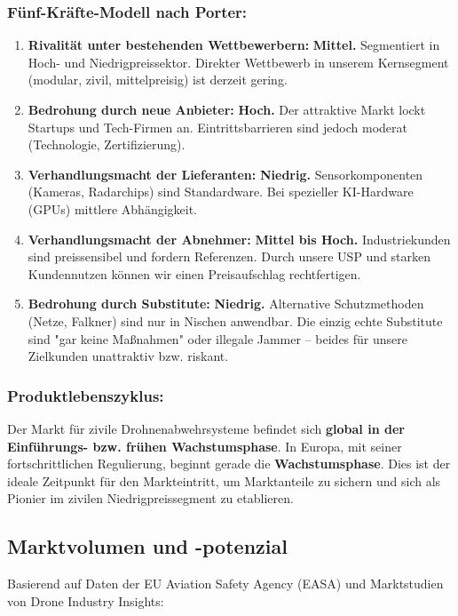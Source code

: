 \documentclass[11pt,a4paper]{article}
\begin{document}
\subsubsection{Fünf-Kräfte-Modell nach Porter:}
\begin{enumerate}
    \item \textbf{Rivalität unter bestehenden Wettbewerbern:} \textbf{Mittel.} Segmentiert in Hoch- und Niedrigpreissektor. Direkter Wettbewerb in unserem Kernsegment (modular, zivil, mittelpreisig) ist derzeit gering.
    
    \item \textbf{Bedrohung durch neue Anbieter:} \textbf{Hoch.} Der attraktive Markt lockt Startups und Tech-Firmen an. Eintrittsbarrieren sind jedoch moderat (Technologie, Zertifizierung).
    
    \item \textbf{Verhandlungsmacht der Lieferanten:} \textbf{Niedrig.} Sensorkomponenten (Kameras, Radarchips) sind Standardware. Bei spezieller KI-Hardware (GPUs) mittlere Abhängigkeit.
    
    \item \textbf{Verhandlungsmacht der Abnehmer:} \textbf{Mittel bis Hoch.} Industriekunden sind preissensibel und fordern Referenzen. Durch unsere USP und starken Kundennutzen können wir einen Preisaufschlag rechtfertigen.
    
    \item \textbf{Bedrohung durch Substitute:} \textbf{Niedrig.} Alternative Schutzmethoden (Netze, Falkner) sind nur in Nischen anwendbar. Die einzig echte Substitute sind "gar keine Maßnahmen" oder illegale Jammer – beides für unsere Zielkunden unattraktiv bzw. riskant.
\end{enumerate}

\subsubsection{Produktlebenszyklus:}
Der Markt für zivile Drohnenabwehrsysteme befindet sich \textbf{global in der Einführungs- bzw. frühen Wachstumsphase}. In Europa, mit seiner fortschrittlichen Regulierung, beginnt gerade die \textbf{Wachstumsphase}. Dies ist der ideale Zeitpunkt für den Markteintritt, um Marktanteile zu sichern und sich als Pionier im zivilen Niedrigpreissegment zu etablieren.

\subsection{Marktvolumen und -potenzial}
Basierend auf Daten der EU Aviation Safety Agency (EASA) und Marktstudien von Drone Industry Insights:
\end{document}
